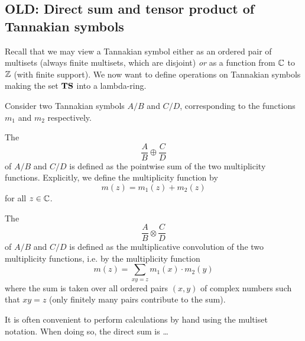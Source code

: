 \subsection{OLD: Direct sum and tensor product of Tannakian symbols}

Recall that we may view a Tannakian symbol either as an ordered pair of multisets (always finite multisets, which are disjoint) \emph{or} as a function from $\mathbb{C}$ to $\mathbb{Z}$ (with finite support). We now want to define operations on Tannakian symbols making the set $\mathbf{TS}$ into a lambda-ring. 

Consider two Tannakian symbols $A/B$ and $C/D$, corresponding to the functions $m_1$ and $m_2$ respectively.

\begin{definition} 
The  
$$ \frac{A}{B}  \oplus \frac{C}{D}   $$
of $A/B$ and $C/D$ is defined as the pointwise sum of the two multiplicity functions. Explicitly, we define the multiplicity function by
$$ m(z) = m_1(z) + m_2(z)  $$
for all $z \in \mathbb{C}$. 
\end{definition}

\begin{definition} 
The  
$$ \frac{A}{B}  \otimes \frac{C}{D}   $$
of $A/B$ and $C/D$ is defined as the multiplicative convolution of the two multiplicity functions, i.e. by the multiplicity function
$$ m(z) = \sum_{xy = z} m_1(x) \cdot m_2(y)  $$
where the sum is taken over all ordered pairs $(x, y)$ of complex numbers such that $xy=z$ (only finitely many pairs contribute to the sum). 
\end{definition}

It is often convenient to perform calculations by hand using the multiset notation. When doing so, the direct sum is \ldots

